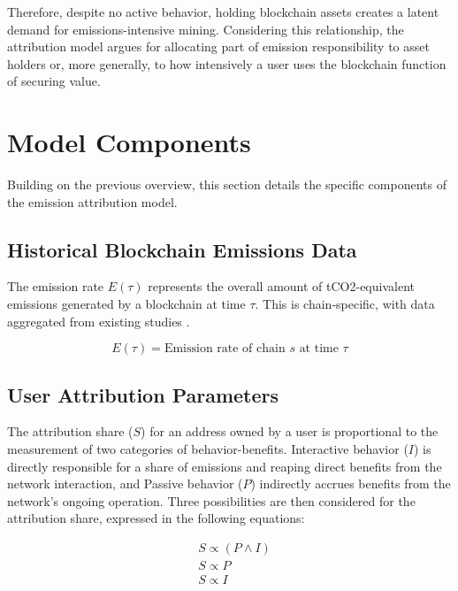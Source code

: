 \documentclass[11pt]{report}
\begin{document}
Therefore, despite no active behavior, holding blockchain assets creates a latent demand for emissions-intensive mining. Considering this relationship, the attribution model argues for allocating part of emission responsibility to asset holders or, more generally, to how intensively a user uses the blockchain function of securing value.

\section{Model Components}

Building on the previous overview, this section details the specific components of the emission attribution model.

\subsection{Historical Blockchain Emissions Data}
The emission rate \(E(\tau)\) represents the overall amount of tCO2-equivalent emissions generated by a blockchain at time $\tau$. This is chain-specific, with data aggregated from existing studies \cite{neumuellerCambridgeBitcoinElectricity2021,stollCarbonFootprintBitcoin2019}.

\begin{equation}
    E(\tau) = \text{Emission rate of chain $s$ at time $\tau$}
    \label{eq:emission_rate}
\end{equation}


\subsection{User Attribution Parameters}

The attribution share ($S$) for an address owned by a user is proportional to the measurement of two categories of behavior-benefits. Interactive behavior ($I$) is directly responsible for a share of emissions and reaping direct benefits from the network interaction, and Passive behavior ($P$) indirectly accrues benefits from the network's ongoing operation. Three possibilities are then considered for the attribution share, expressed in the following equations:

\begin{align}
     & S \propto (P \wedge I) \\
     & S \propto P            \\
     & S \propto I
    \label{eq:attribution_share}
\end{align}
\end{document}

